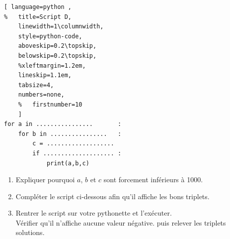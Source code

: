 \begin{exercise}
\begin{enumerate}[label=\arabic*),leftmargin=*]
\noindent \begin{lstlisting}[ language=python , 
%	title=Script D,   
	linewidth=1\columnwidth,
	style=python-code,    
	aboveskip=0.2\topskip,
	belowskip=0.2\topskip,
	%xleftmargin=1.2em,
	lineskip=1.1em,
	tabsize=4, 
	numbers=none,
	%	firstnumber=10  
	] 
for a in ................       :
	for b in ................   :
		c = ...................
		if .................... :
			print(a,b,c)
\end{lstlisting} 
\begin{enumerate}[label=\alph*),leftmargin=*]
	\item Expliquer pourquoi $a$, $b$ et $c$ sont forcement inférieurs à 1000.
	\item Compléter le script ci-dessous afin qu'il affiche les bons triplets.
	\item Rentrer le script sur votre pythonette et l'exécuter. \\
	Vérifier qu'il n'affiche aucune valeur négative. puis relever les triplets solutions.
\end{enumerate} 
\end{enumerate}
\end{exercise}
%	 

